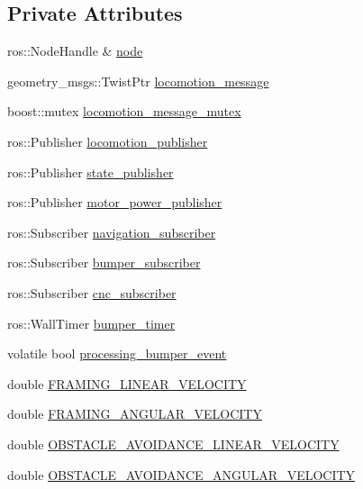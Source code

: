 \subsection*{\-Private \-Attributes}
\begin{DoxyCompactItemize}
\item 
ros\-::\-Node\-Handle \& \hyperlink{class_r_p_locomotion_node_ad07de383fa61683b6dd9c38944e4d33b}{node}
\item 
geometry\-\_\-msgs\-::\-Twist\-Ptr \hyperlink{class_r_p_locomotion_node_ac9668ec315e5c8b9b45e6c1ee9cd18ee}{locomotion\-\_\-message}
\item 
boost\-::mutex \hyperlink{class_r_p_locomotion_node_aa852cb0599e4ad545d01339479d20121}{locomotion\-\_\-message\-\_\-mutex}
\item 
ros\-::\-Publisher \hyperlink{class_r_p_locomotion_node_a1dca36a6b277f383b193f06c52936c08}{locomotion\-\_\-publisher}
\item 
ros\-::\-Publisher \hyperlink{class_r_p_locomotion_node_aceea8151b1de15fbf9485e1f301db004}{state\-\_\-publisher}
\item 
ros\-::\-Publisher \hyperlink{class_r_p_locomotion_node_a89e8536163d4d7b1f2c10f27dbb16724}{motor\-\_\-power\-\_\-publisher}
\item 
ros\-::\-Subscriber \hyperlink{class_r_p_locomotion_node_a653bdeea59dab13aa8b207ed726b055c}{navigation\-\_\-subscriber}
\item 
ros\-::\-Subscriber \hyperlink{class_r_p_locomotion_node_a7b70ee96f05b97044e14b81c383c671e}{bumper\-\_\-subscriber}
\item 
ros\-::\-Subscriber \hyperlink{class_r_p_locomotion_node_a90e0e6121d6eddacb4c7a4598f29b331}{cnc\-\_\-subscriber}
\item 
ros\-::\-Wall\-Timer \hyperlink{class_r_p_locomotion_node_ae8be6c08928b529659031829fb1f9d31}{bumper\-\_\-timer}
\item 
volatile bool \hyperlink{class_r_p_locomotion_node_acf41adc43410bff9116a493b42ffde87}{processing\-\_\-bumper\-\_\-event}
\item 
double \hyperlink{class_r_p_locomotion_node_a35b3c79ea9c02d5a8d7c01148187a95f}{\-F\-R\-A\-M\-I\-N\-G\-\_\-\-L\-I\-N\-E\-A\-R\-\_\-\-V\-E\-L\-O\-C\-I\-T\-Y}
\item 
double \hyperlink{class_r_p_locomotion_node_aeed6c095a09f0e720615d21c247a7091}{\-F\-R\-A\-M\-I\-N\-G\-\_\-\-A\-N\-G\-U\-L\-A\-R\-\_\-\-V\-E\-L\-O\-C\-I\-T\-Y}
\item 
double \hyperlink{class_r_p_locomotion_node_acfdd2fb267d49557666d59d640f83bdd}{\-O\-B\-S\-T\-A\-C\-L\-E\-\_\-\-A\-V\-O\-I\-D\-A\-N\-C\-E\-\_\-\-L\-I\-N\-E\-A\-R\-\_\-\-V\-E\-L\-O\-C\-I\-T\-Y}
\item 
double \hyperlink{class_r_p_locomotion_node_abbdfb4df3d7f36c1931d48d49a5ffc30}{\-O\-B\-S\-T\-A\-C\-L\-E\-\_\-\-A\-V\-O\-I\-D\-A\-N\-C\-E\-\_\-\-A\-N\-G\-U\-L\-A\-R\-\_\-\-V\-E\-L\-O\-C\-I\-T\-Y}
\end{DoxyCompactItemize}


